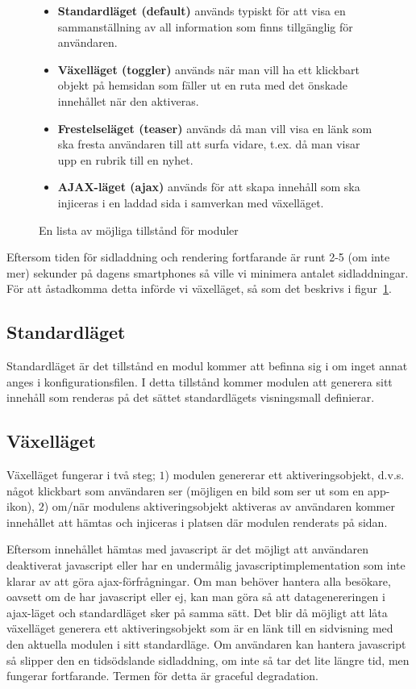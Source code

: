 \begin{figure}[h]
\begin{itemize}
  \item {\bf Standardläget (default)}  används typiskt för att visa en
    sammanställning av all information som finns tillgänglig för
    användaren.
  \item {\bf Växelläget (toggler)}  används när man vill ha ett
    klickbart objekt på hemsidan som fäller ut en ruta med det önskade
    innehållet när den aktiveras.
  \item {\bf Frestelseläget (teaser)}  används då man vill visa en länk
    som ska fresta användaren till att surfa vidare, t.ex. då man visar
    upp en rubrik till en nyhet.
  \item {\bf AJAX-läget (ajax)}  används för att skapa innehåll som ska
    injiceras i en laddad sida i samverkan med växelläget.
\end{itemize}
\caption{En lista av möjliga tillstånd för moduler\label{list:modes}}
\end{figure}

Eftersom tiden för sidladdning och rendering fortfarande är runt 2-5 (om
inte mer) sekunder på dagens smartphones så ville vi minimera antalet
sidladdningar. För att åstadkomma detta införde vi växelläget, så som
det beskrivs i figur~\ref{list:modes}.

\subsection{Standardläget}
Standardläget är det tillstånd en modul kommer att befinna sig i om
inget annat anges i konfigurationsfilen. I detta tillstånd kommer
modulen att generera sitt innehåll som renderas på det sättet
standardlägets visningsmall definierar.

\subsection{Växelläget}
Växelläget fungerar i två steg; $1$) modulen genererar ett
aktiveringsobjekt, d.v.s. något klickbart som användaren ser (möjligen
en bild som ser ut som en app-ikon), $2$) om/när modulens
aktiveringsobjekt aktiveras av användaren kommer innehållet att hämtas
och injiceras i platsen där modulen renderats på sidan.

Eftersom innehållet hämtas med javascript är det möjligt att användaren
deaktiverat javascript eller har en undermålig javascriptimplementation
som inte klarar av att göra ajax-förfrågningar. Om man behöver hantera
alla besökare, oavsett om de har javascript eller ej, kan man göra så
att datagenereringen i ajax-läget och standardläget sker på samma sätt.
Det blir då möjligt att låta växelläget generera ett aktiveringsobjekt
som är en länk till en sidvisning med den aktuella modulen i sitt
standardläge. Om användaren kan hantera javascript så slipper den en
tidsödslande sidladdning, om inte så tar det lite längre tid, men
fungerar fortfarande. Termen för detta är \dq graceful degradation\dq.

